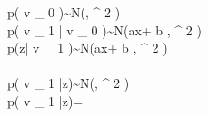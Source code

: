 p({ v }_{ 0 })\quad \sim \quad N(\mu ,{ \sigma  }^{ 2 })\\ p({ v }_{ 1 }|{ v }_{ 0 })\quad \sim \quad N(ax+{ b },{ \sigma  }^{ 2 })\\ p(z|{ v }_{ 1 })\quad \sim \quad N(ax+{ b },{ \sigma  }^{ 2 })\\ \\ p({ v }_{ 1 }|z)\quad \sim \quad N(\mu ,{ \sigma  }^{ 2 })\\ p({ v }_{ 1 }|z)\quad =\quad {} \\ \\ \\ \\ 